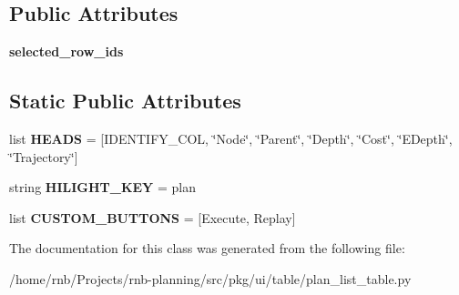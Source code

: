 \subsection*{Public Attributes}
\begin{DoxyCompactItemize}
\item 
\mbox{\label{classrnb-planning_1_1src_1_1pkg_1_1ui_1_1table_1_1plan__list__table_1_1_plan_list_table_ab500447eb3ecbcc2493e188c54185715}} 
{\bfseries selected\+\_\+row\+\_\+ids}
\end{DoxyCompactItemize}
\subsection*{Static Public Attributes}
\begin{DoxyCompactItemize}
\item 
\mbox{\label{classrnb-planning_1_1src_1_1pkg_1_1ui_1_1table_1_1plan__list__table_1_1_plan_list_table_a8fdb028ddd252b07deeb027c52e335b8}} 
list {\bfseries H\+E\+A\+DS} = \mbox{[}I\+D\+E\+N\+T\+I\+F\+Y\+\_\+\+C\+OL, \char`\"{}Node\char`\"{}, \char`\"{}Parent\char`\"{}, \char`\"{}Depth\char`\"{}, \char`\"{}Cost\char`\"{}, \char`\"{}E\+Depth\char`\"{}, \char`\"{}Trajectory\char`\"{}\mbox{]}
\item 
\mbox{\label{classrnb-planning_1_1src_1_1pkg_1_1ui_1_1table_1_1plan__list__table_1_1_plan_list_table_a77383176a422ba7221ca96bd5b74bbcb}} 
string {\bfseries H\+I\+L\+I\+G\+H\+T\+\_\+\+K\+EY} = \textquotesingle{}plan\textquotesingle{}
\item 
\mbox{\label{classrnb-planning_1_1src_1_1pkg_1_1ui_1_1table_1_1plan__list__table_1_1_plan_list_table_a2521f3181439024998ee54539e0f40b7}} 
list {\bfseries C\+U\+S\+T\+O\+M\+\_\+\+B\+U\+T\+T\+O\+NS} = \mbox{[}\textquotesingle{}Execute\textquotesingle{}, \textquotesingle{}Replay\textquotesingle{}\mbox{]}
\end{DoxyCompactItemize}


The documentation for this class was generated from the following file\+:\begin{DoxyCompactItemize}
\item 
/home/rnb/\+Projects/rnb-\/planning/src/pkg/ui/table/plan\+\_\+list\+\_\+table.\+py\end{DoxyCompactItemize}
